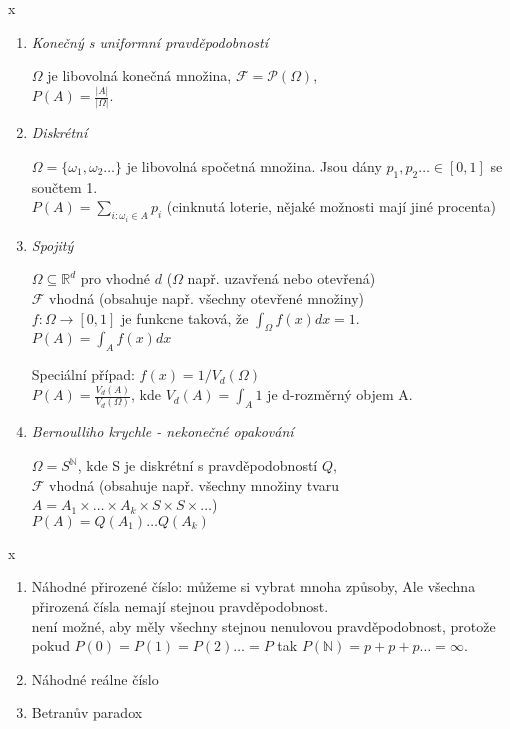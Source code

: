\documentclass[../main.tex]{subfiles}
\begin{document}
\begin{example}
    {\color{white} x} %
    \begin{enumerate}
        \item 
        \textit{Konečný s uniformní pravděpodobností}

        $\Omega$ je libovolná konečná množina, $\mathcal{F} = \mathcal{P}(\Omega)$,\\
        $P(A) = \frac{|A|}{|\Omega|}$.
        \item 
        \textit{Diskrétní}

        $\Omega = \{\omega_1,\omega_2\dots\}$ je libovolná spočetná množina. Jsou dány $p_1,p_2\dots \in [0,1]$ se součtem 1.\\
        $P(A) = \sum_{i:\omega_i \in A} p_i$ (cinknutá loterie, nějaké možnosti mají jiné procenta)
        \item 
        \textit{Spojitý}

        $\Omega \subseteq \mathbb{R}^d$ pro vhodné $d$ ($\Omega$ např. uzavřená nebo otevřená)\\
        $\mathcal{F}$ vhodná (obsahuje např. všechny otevřené množiny)\\
        $f:\Omega \rightarrow [0,1]$ je funkcne taková, že $\int_{\Omega} f(x)dx = 1$.\\
        $P(A) = \int_{A}f(x)dx$

        Speciální případ: $f(x) = 1/V_d(\Omega)$\\
        $P(A) = \frac{V_d(A)}{V_d(\Omega)}$, kde $V_d(A) = \int_A 1$ je d-rozměrný objem A.
        
        \item 
        \textit{Bernoulliho krychle - nekonečné opakování}

        $\Omega = S^{\mathbb{N}}$, kde S je diskrétní s pravděpodobností $Q$,\\
        $\mathcal{F}$ vhodná (obsahuje např. všechny množiny tvaru\\
        $A = A_1 \times \dots \times A_k \times S \times S \times \dots $)\\
        $P(A) = Q(A_1) \dots Q(A_k)$\\
    \end{enumerate}
\end{example}

\newpage
\begin{example}[Nepříklady]
    {\color{white} x}
    \begin{enumerate}
        \item Náhodné přirozené číslo: můžeme si vybrat mnoha způsoby, Ale všechna přirozená čísla nemají stejnou pravděpodobnost.\\
        není možné, aby měly všechny stejnou nenulovou pravděpodobnost, protože pokud $P(0) = P(1) = P(2)\dots = P$ tak $P(\mathbb{N}) = p + p + p\dots = \infty$.
        \item Náhodné reálne číslo
        \item Betranův paradox
    \end{enumerate}
\end{example}
\end{document}
